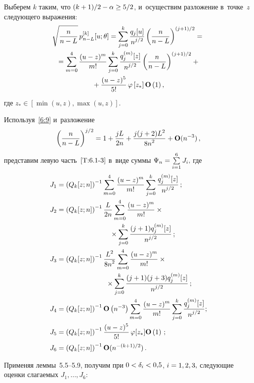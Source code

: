 \begin{multicols}{2}
   Выберем $k$ таким, что $(k\hm+1)/2\hm-\alpha\hm\ge 5/2$,
   и~осуществим разложение в~точке~$z$ следующего выражения:
 \begin{multline*}
   \sqrt{\displaystyle\frac{\displaystyle n\mathstrut}{\displaystyle n-L\mathstrut}}\, p_{n-L}^{[k]}[u;\theta]=
  \sum\limits_{j=0}^k \displaystyle\frac{\displaystyle q_j[u]\mathstrut}{\displaystyle n^{j/2}\mathstrut}\left(\displaystyle\frac{\displaystyle n\mathstrut}{\displaystyle n-L\mathstrut}\right)^
  {(j+1)/2}={}
\\ {}  =
  \sum\limits_{m=0}^4 \displaystyle\frac{\displaystyle (u-z)^m\mathstrut}{\displaystyle m!\mathstrut}\sum_{j=0}^k \displaystyle\frac{\displaystyle q_j^{(m)}[z]\mathstrut}{\displaystyle n^{j/2}\mathstrut}
  \left(\displaystyle\frac{\displaystyle n\mathstrut}{\displaystyle n-L\mathstrut}\right)^{(j+1)/2}+{}\\
  {}+
  \displaystyle\frac{\displaystyle (u-z)^5\mathstrut}{\displaystyle 5!\mathstrut}\, \varphi\left[z_*\right] \mathbf{O}\left(1\right),
 \end{multline*}
 где $z_*\in \left[\min (u,z),\max (u,z) \right]$.

 Используя~\eqref{6:9} и~разложение
 \begin{equation*}
\left( \displaystyle\frac{\displaystyle n\mathstrut}{\displaystyle n-L\mathstrut}\right)^{j/2}
  = 1+\displaystyle\frac{\displaystyle jL\mathstrut}{\displaystyle 2n\mathstrut}+\displaystyle\frac{\displaystyle j(j+2)L^2\mathstrut}{\displaystyle 8n^2\mathstrut}+\mathbf{O}(n^{-3})\,,
 \end{equation*}
 представим левую часть~$\eqref{T:6.1-3}$ в~виде суммы $\Psi_n\hm=\sum\limits_{i=1}^6 J_i,$
 где
 \begin{align*}
 J_1&=\left(Q_k[z;n]\right)^{-1}\sum\limits_{m=0}^4 \fr{(u-z)^m}{m!}\sum_{j=0}^k \fr{q_j^{(m)}[z]}{n^{j/2}}\,;
\\
 J_2&=\left(Q_k[z;n]\right)^{-1}\fr{L}{2n}\sum\limits_{m=0}^4 
 \fr{(u-z)^m}{m!}\times{}\\
 &\hspace*{27mm}{}\times \sum\limits_{j=0}^k \fr{(j+1)q_j^{(m)}[z]}{n^{j/2}}\,;
\\
 J_3&=\left(Q_k[z;n]\right)^{-1}\fr{L^2}{8n^2}\sum\limits_{m=0}^4 \fr{(u-z)^m}{m!}\times{}\\
 &\hspace*{25mm}{}\times\sum\limits_{j=0}^k \fr{(j+1)(j+3)q_j^{(m)}[z]}{n^{j/2}}\,;
\\
 J_4&=\left(Q_k[z;n]\right)^{-1}\Op\left(n^{-3}\right)\sum_{m=0}^4 \fr{(u-z)^m}{m!}\sum\limits_{j=0}^k \fr{q_j^{(m)}[z]}{n^{j/2}};
\\
 J_5&=  \left(Q_k[z;n]\right)^{-1}\fr{(u-z)^5}{5!}\, \varphi[z_*]\Op\left(1\right)\,;\\  
 J_6&=\left(Q_k[z;n]\right)^{-1}\Op(n^{-(k+1)/2})\,.
 \end{align*}

 Применяя леммы~5.5--5.9, получим при $0\hm<\delta_i\hm<0{,}5$, $i\hm=1,2,3,$ 
 следующие оценки слагаемых $J_1,\ldots,J_6$:


\end{multicols}

